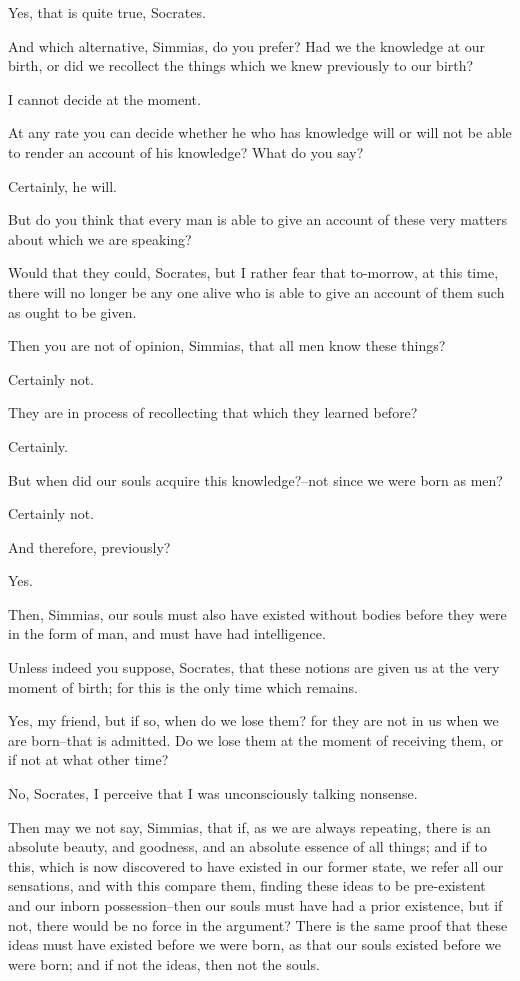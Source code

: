 Yes, that is quite true, Socrates.

And which alternative, Simmias, do you prefer? Had we the knowledge at
our birth, or did we recollect the things which we knew previously to
our birth?

I cannot decide at the moment.

At any rate you can decide whether he who has knowledge will or will not
be able to render an account of his knowledge? What do you say?

Certainly, he will.

But do you think that every man is able to give an account of these very
matters about which we are speaking?

Would that they could, Socrates, but I rather fear that to-morrow, at
this time, there will no longer be any one alive who is able to give an
account of them such as ought to be given.

Then you are not of opinion, Simmias, that all men know these things?

Certainly not.

They are in process of recollecting that which they learned before?

Certainly.

But when did our souls acquire this knowledge?--not since we were born
as men?

Certainly not.

And therefore, previously?

Yes.

Then, Simmias, our souls must also have existed without bodies before
they were in the form of man, and must have had intelligence.

Unless indeed you suppose, Socrates, that these notions are given us at
the very moment of birth; for this is the only time which remains.

Yes, my friend, but if so, when do we lose them? for they are not in
us when we are born--that is admitted. Do we lose them at the moment of
receiving them, or if not at what other time?

No, Socrates, I perceive that I was unconsciously talking nonsense.

Then may we not say, Simmias, that if, as we are always repeating, there
is an absolute beauty, and goodness, and an absolute essence of all
things; and if to this, which is now discovered to have existed in our
former state, we refer all our sensations, and with this compare them,
finding these ideas to be pre-existent and our inborn possession--then
our souls must have had a prior existence, but if not, there would be
no force in the argument? There is the same proof that these ideas must
have existed before we were born, as that our souls existed before we
were born; and if not the ideas, then not the souls.


